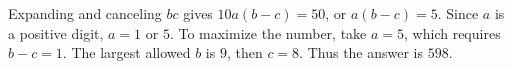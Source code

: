 Expanding and canceling $bc$ gives $10a(b-c)=50$, or $a(b-c)=5$. Since $a$ is a positive digit, $a=1$ or $5$. To maximize the number, take $a=5$, which requires $b-c=1$. The largest allowed $b$ is $9$, then $c=8$. Thus the answer is $\boxed{598}$.
